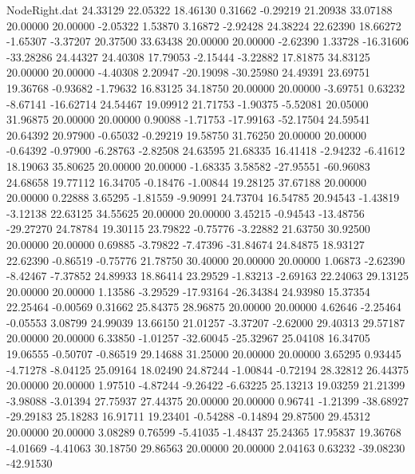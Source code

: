 \begin{filecontents}{NodeRight.dat}
  24.33129   22.05322   18.46130     0.31662   -0.29219   21.20938   33.07188   20.00000   20.00000   -2.05322    1.53870    3.16872   -2.92428
  24.38224   22.62390   18.66272    -1.65307   -3.37207   20.37500   33.63438   20.00000   20.00000   -2.62390    1.33728  -16.31606  -33.28286
  24.44327   24.40308   17.79053    -2.15444   -3.22882   17.81875   34.83125   20.00000   20.00000   -4.40308    2.20947  -20.19098  -30.25980
  24.49391   23.69751   19.36768    -0.93682   -1.79632   16.83125   34.18750   20.00000   20.00000   -3.69751    0.63232   -8.67141  -16.62714
  24.54467   19.09912   21.71753    -1.90375   -5.52081   20.05000   31.96875   20.00000   20.00000    0.90088   -1.71753  -17.99163  -52.17504
  24.59541   20.64392   20.97900    -0.65032   -0.29219   19.58750   31.76250   20.00000   20.00000   -0.64392   -0.97900   -6.28763   -2.82508
  24.63595   21.68335   16.41418    -2.94232   -6.41612   18.19063   35.80625   20.00000   20.00000   -1.68335    3.58582  -27.95551  -60.96083
  24.68658   19.77112   16.34705    -0.18476   -1.00844   19.28125   37.67188   20.00000   20.00000    0.22888    3.65295   -1.81559   -9.90991
  24.73704   16.54785   20.94543    -1.43819   -3.12138   22.63125   34.55625   20.00000   20.00000    3.45215   -0.94543  -13.48756  -29.27270
  24.78784   19.30115   23.79822    -0.75776   -3.22882   21.63750   30.92500   20.00000   20.00000    0.69885   -3.79822   -7.47396  -31.84674
  24.84875   18.93127   22.62390    -0.86519   -0.75776   21.78750   30.40000   20.00000   20.00000    1.06873   -2.62390   -8.42467   -7.37852
  24.89933   18.86414   23.29529    -1.83213   -2.69163   22.24063   29.13125   20.00000   20.00000    1.13586   -3.29529  -17.93164  -26.34384
  24.93980   15.37354   22.25464    -0.00569    0.31662   25.84375   28.96875   20.00000   20.00000    4.62646   -2.25464   -0.05553    3.08799
  24.99039   13.66150   21.01257    -3.37207   -2.62000   29.40313   29.57187   20.00000   20.00000    6.33850   -1.01257  -32.60045  -25.32967
  25.04108   16.34705   19.06555    -0.50707   -0.86519   29.14688   31.25000   20.00000   20.00000    3.65295    0.93445   -4.71278   -8.04125
  25.09164   18.02490   24.87244    -1.00844   -0.72194   28.32812   26.44375   20.00000   20.00000    1.97510   -4.87244   -9.26422   -6.63225
  25.13213   19.03259   21.21399    -3.98088   -3.01394   27.75937   27.44375   20.00000   20.00000    0.96741   -1.21399  -38.68927  -29.29183
  25.18283   16.91711   19.23401    -0.54288   -0.14894   29.87500   29.45312   20.00000   20.00000    3.08289    0.76599   -5.41035   -1.48437
  25.24365   17.95837   19.36768    -4.01669   -4.41063   30.18750   29.86563   20.00000   20.00000    2.04163    0.63232  -39.08230  -42.91530

\end{filecontents}
